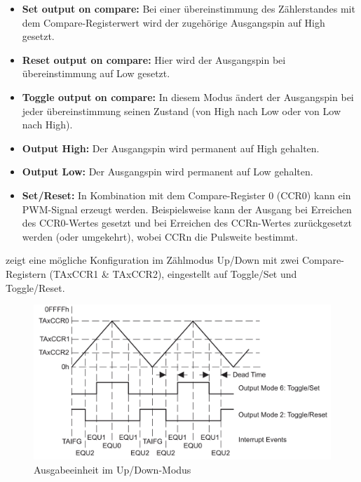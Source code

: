 \begin{itemize}
	\item \textbf{Set output on compare:} Bei einer \"ubereinstimmung des Z\"ahlerstandes mit dem Compare-Registerwert wird der zugeh\"orige Ausgangspin auf High gesetzt.

	\item \textbf{Reset output on compare:} Hier wird der Ausgangspin bei \"ubereinstimmung auf Low gesetzt.

	\item \textbf{Toggle output on compare:} In diesem Modus \"andert der Ausgangspin bei jeder \"ubereinstimmung seinen Zustand (von High nach Low oder von Low nach High).

	\item \textbf{Output High:} Der Ausgangspin wird permanent auf High gehalten.

	\item \textbf{Output Low:} Der Ausgangspin wird permanent auf Low gehalten.

	\item \textbf{Set/Reset:} In Kombination mit dem Compare-Register 0 (CCR0) kann ein PWM-Signal erzeugt werden. Beispielsweise kann der Ausgang bei Erreichen des CCR0-Wertes gesetzt und bei Erreichen des CCRn-Wertes zur\"uckgesetzt werden (oder umgekehrt), wobei CCRn die Pulsweite bestimmt.
\end{itemize}

 zeigt eine m\"ogliche Konfiguration im Z\"ahlmodus Up/Down mit zwei Compare-Registern (TAxCCR1 \& TAxCCR2), eingestellt auf Toggle/Set und Toggle/Reset.

\begin{figure}[h!]
	\centering
	\includegraphics[width=1.0\textwidth]{../Bilder/UpDown_ModeBsp.png}
	\caption{Ausgabeeinheit im Up/Down-Modus\\}
	\label{fig:OutputUnit_UpDown_Mode}
\end{figure}

